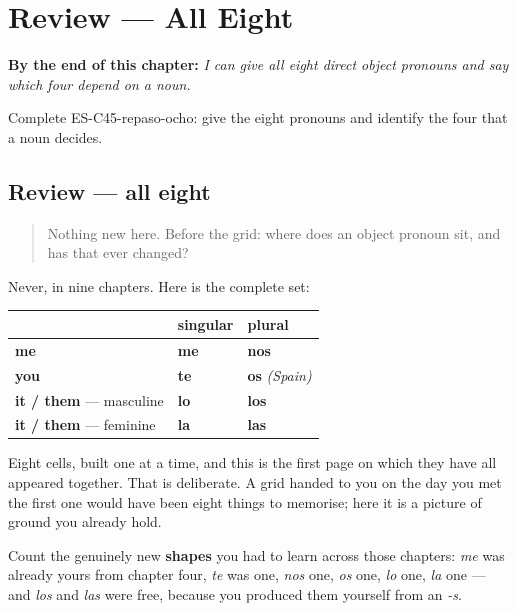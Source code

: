 
\chapter{Review --- All Eight}
\label{ch:review-object-complete}

\begin{chapteropening}
\textbf{By the end of this chapter:} \emph{I can give all eight direct object pronouns and say which four depend on a noun.}

Complete ES-C45-repaso-ocho: give the eight pronouns and identify the four that a noun decides.
\end{chapteropening}

\section[Practice]{Review — all eight}

\label{lesson:ES-C45-repaso-ocho}



\begin{quote}
Nothing new here. Before the grid: where does an object pronoun sit, and has that ever changed?
\end{quote}

\begin{grammarlens}[title={What you've built}]
Never, in nine chapters. Here is the complete set:

\noindent
\begin{tabularx}{\linewidth}{@{}>{\raggedright\arraybackslash}X>{\raggedright\arraybackslash}X>{\raggedright\arraybackslash}X@{}}
\toprule
\textbf{} & \textbf{singular} & \textbf{plural} \\
\midrule
\textbf{me} & \textbf{me} & \textbf{nos} \\
\textbf{you} & \textbf{te} & \textbf{os} \emph{(Spain)} \\
\textbf{it / them} — masculine & \textbf{lo} & \textbf{los} \\
\textbf{it / them} — feminine & \textbf{la} & \textbf{las} \\
\bottomrule
\end{tabularx}

Eight cells, built one at a time, and this is the first page on which they have all appeared together. That is deliberate. A grid handed to you on the day you met the first one would have been eight things to memorise; here it is a picture of ground you already hold.

Count the genuinely new \textbf{shapes} you had to learn across those chapters: \emph{me} was already yours from chapter four, \emph{te} was one, \emph{nos} one, \emph{os} one, \emph{lo} one, \emph{la} one — and \emph{los} and \emph{las} were free, because you produced them yourself from an \emph{-s}.
\end{grammarlens}

